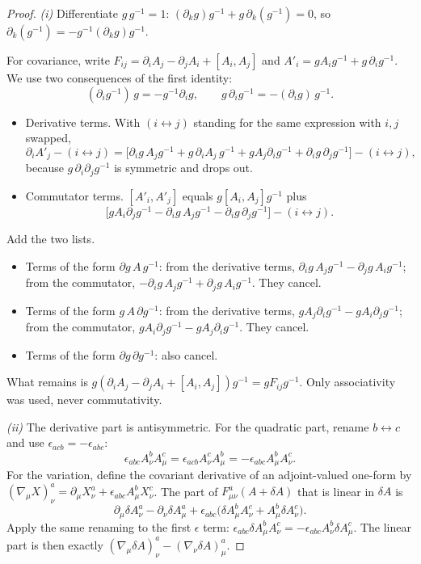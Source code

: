 \begin{proof}
\emph{(i)} Differentiate $g\,g^{-1}=1$: $(\partial_kg)g^{-1}+g\,\partial_k(g^{-1})=0$, so $\partial_k(g^{-1})=-g^{-1}(\partial_kg)g^{-1}$.

For covariance, write $F_{ij}=\partial_iA_j-\partial_jA_i+[A_i,A_j]$ and $A'_i=gA_ig^{-1}+g\,\partial_ig^{-1}$. We use two consequences of the first identity:
\[
(\partial_ig^{-1})\,g=-g^{-1}\partial_ig,\qquad g\,\partial_ig^{-1}=-(\partial_ig)\,g^{-1}.
\]
\begin{itemize}[nosep]
\item Derivative terms. With $(i\leftrightarrow j)$ standing for the same expression with $i,j$ swapped,
\[
\partial_iA'_j-(i\leftrightarrow j)=\bigl[\partial_ig\,A_jg^{-1}+g\,\partial_iA_j\,g^{-1}+gA_j\partial_ig^{-1}+\partial_ig\,\partial_jg^{-1}\bigr]-(i\leftrightarrow j),
\]
because $g\,\partial_i\partial_jg^{-1}$ is symmetric and drops out.
\item Commutator terms. $[A'_i,A'_j]$ equals $g[A_i,A_j]g^{-1}$ plus
\[
\bigl[gA_i\partial_jg^{-1}-\partial_ig\,A_jg^{-1}-\partial_ig\,\partial_jg^{-1}\bigr]-(i\leftrightarrow j).
\]
\end{itemize}
Add the two lists.
\begin{itemize}[nosep]
\item Terms of the form $\partial g\,A\,g^{-1}$: from the derivative terms, $\partial_ig\,A_jg^{-1}-\partial_jg\,A_ig^{-1}$; from the commutator, $-\partial_ig\,A_jg^{-1}+\partial_jg\,A_ig^{-1}$. They cancel.
\item Terms of the form $g\,A\,\partial g^{-1}$: from the derivative terms, $gA_j\partial_ig^{-1}-gA_i\partial_jg^{-1}$; from the commutator, $gA_i\partial_jg^{-1}-gA_j\partial_ig^{-1}$. They cancel.
\item Terms of the form $\partial g\,\partial g^{-1}$: also cancel.
\end{itemize}
What remains is $g(\partial_iA_j-\partial_jA_i+[A_i,A_j])g^{-1}=gF_{ij}g^{-1}$. Only associativity was used, never commutativity.

\emph{(ii)} The derivative part is antisymmetric. For the quadratic part, rename $b\leftrightarrow c$ and use $\epsilon_{acb}=-\epsilon_{abc}$:
\[
\epsilon_{abc}A^b_\nu A^c_\mu=\epsilon_{acb}A^c_\nu A^b_\mu=-\epsilon_{abc}A^b_\mu A^c_\nu .
\]
For the variation, define the covariant derivative of an adjoint-valued one-form by $(\nabla_\mu X)^a_\nu=\partial_\mu X^a_\nu+\epsilon_{abc}A^b_\mu X^c_\nu$. The part of $F^a_{\mu\nu}(A+\delta A)$ that is linear in $\delta A$ is
\[
\partial_\mu\delta A^a_\nu-\partial_\nu\delta A^a_\mu+\epsilon_{abc}\bigl(\delta A^b_\mu A^c_\nu+A^b_\mu\delta A^c_\nu\bigr).
\]
Apply the same renaming to the first $\epsilon$ term: $\epsilon_{abc}\delta A^b_\mu A^c_\nu=-\epsilon_{abc}A^b_\nu\delta A^c_\mu$. The linear part is then exactly $(\nabla_\mu\delta A)^a_\nu-(\nabla_\nu\delta A)^a_\mu$.


\end{proof}

